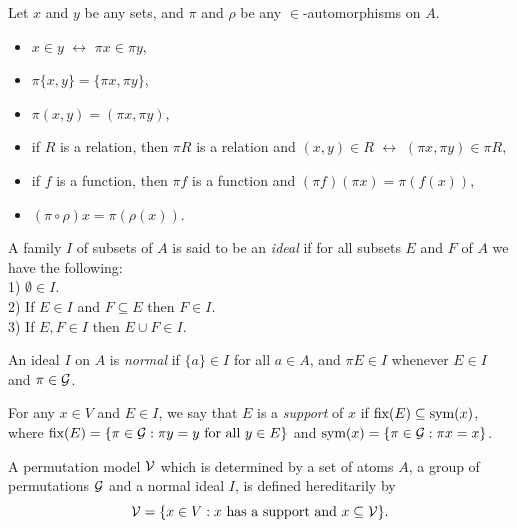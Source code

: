 \begin{theorem}
Let $x$ and $y$ be any sets, and $\pi$ and $\rho$ be any $\in$-automorphisms on $A$.
    \begin{itemize}
        \item[1)] $x\in y$ $\leftrightarrow$ $\pi x\in\pi y$,
        \item[2)] $\pi \{x,y\}=\{\pi x,\pi y\}$,
        \item[3)] $\pi (x,y)=(\pi x,\pi y)$,
        \item[4)] if $R$ is a relation, then $\pi R$ is a relation and $(x,y)\in R$ $\leftrightarrow$ $(\pi x,\pi y)\in \pi R$,
        \item[5)] if $f$ is a function, then $\pi f$ is a function and $(\pi f)(\pi x)=\pi(f(x))$,
        \item[6)] $(\pi\circ\rho)x=\pi(\rho(x))$.
    \end{itemize}    
\end{theorem}


\begin{definition}
    A family $I$ of subsets of $A$ is said to be an \emph{ideal} if for all subsets $E$ and $F$ of $A$ we have the following:\\
    1) $\emptyset\in I$.\\
    2) If $E\in I$ and $F\subseteq E$ then $F\in I$.\\ 
3) If $E,F\in I$ then $E\cup F\in I$.
\end{definition} 

\begin{definition}\textup{
    An ideal $I$ on $A$ is \emph{normal} if $\{a\}\in I$ for all $a\in A$, and $\pi E \in I$ whenever $E\in I$ and $\pi\in\mathcal{G}$.}
\end{definition} 

\begin{definition}\textup{
For any $x\in V$ and $E\in I$, we say that $E$ is a \emph{support} of $x$ if $\textup{fix}(E) \subseteq \textup{sym}(x)$, where $\textup{fix}(E) = \{\pi\in\mathcal{G} : \pi y = y \text{\ for all\ } y\in E\}$ and $\textup{sym}(x) = \{\pi\in\mathcal{G} : \pi x = x\}$.}   
\end{definition}

\begin{definition}\textup{
 A permutation model $\mathcal{V}$ which is determined by a set of atoms $A$, a group of permutations $\mathcal{G}$ and a normal ideal $I$, is defined hereditarily by $$\mathcal{V} = \{ x\in V : x \text{\ has a support and\ } x\subseteq\mathcal{V} \}.$$ }  
\end{definition}

